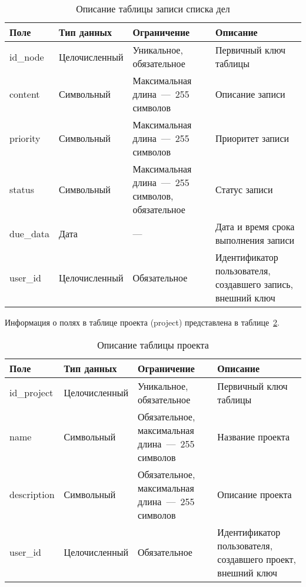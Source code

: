 \begin{table}[H]
	\centering
	\caption{Описание таблицы записи списка дел}
	\label{tab:todo_node}
	\begin{tabularx}{\textwidth}{|l|l|X|X|}
		\hline
		\textbf{Поле} & \textbf{Тип данных} & \textbf{Ограничение} & \textbf{Описание} \\ \hline
		id\_node  & Целочисленный  &  Уникальное, обязательное   & Первичный ключ таблицы  \\ \hline
		content   & Символьный & Максимальная длина~---~255 символов &  Описание записи\\ \hline
		priority  & Символьный & Максимальная длина~---~255 символов&   Приоритет записи \\ \hline
		status  & Символьный & Максимальная длина~---~255 символов, обязательное  &  Статус записи\\ \hline
		due\_data & Дата & --- & Дата и время срока выполнения записи \\ \hline
		user\_id   &Целочисленный & Обязательное  & Идентификатор пользователя, создавшего запись, внешний ключ   \\ \hline
	\end{tabularx}
\end{table}


Информация о полях в таблице проекта (project) представлена в таблице~\ref{tab:project}.


\begin{table}[H]
	\centering
	\caption{Описание таблицы проекта}
	\label{tab:project}
	\begin{tabularx}{\textwidth}{|l|l|X|X|}
		\hline
		\textbf{Поле} & \textbf{Тип данных} & \textbf{Ограничение} & \textbf{Описание} \\ \hline
		id\_project & Целочисленный &  Уникальное, обязательное   & Первичный ключ таблицы  \\ \hline
		name   & Символьный &  Обязательное, максимальная длина~---~255 символов &  Название проекта  \\ \hline
		description  & Символьный &  Обязательное, максимальная длина~---~255 символов  & Описание  проекта\\ \hline
		user\_id  & Целочисленный & Обязательное    & Идентификатор
		 пользователя, создавшего проект, внешний ключ   \\ \hline
	\end{tabularx}
\end{table}


